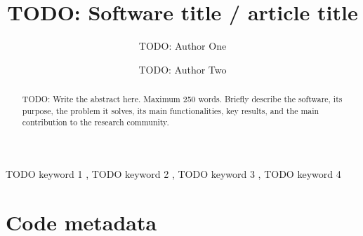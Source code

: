 \documentclass[preprint,12pt]{elsarticle}
\begin{document}
\begin{frontmatter}

\title{TODO: Software title / article title}

\author[aff1]{TODO: Author One}

\author[aff2]{TODO: Author Two}




\begin{abstract}
TODO: Write the abstract here. Maximum 250 words. Briefly describe the software,
its purpose, the problem it solves, its main functionalities, key results, and
the main contribution to the research community.
\end{abstract}

\begin{keyword}
TODO keyword 1 \sep
TODO keyword 2 \sep
TODO keyword 3 \sep
TODO keyword 4
\end{keyword}

\end{frontmatter}

\section*{Code metadata}
\label{sec:metadata}
\end{document}
